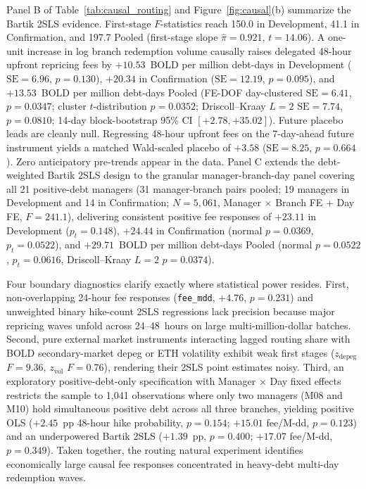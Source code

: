 Panel B of Table~\ref{tab:causal_routing} and Figure~\ref{fig:causal}(b) summarize the Bartik 2SLS evidence. First-stage $F$-statistics reach 150.0 in Development, 41.1 in Confirmation, and 197.7 Pooled (first-stage slope $\hat{\pi} = 0.921$, $t = 14.06$). A one-unit increase in log branch redemption volume causally raises delegated 48-hour upfront repricing fees by $+10.53$~BOLD per million debt-days in Development ($\text{SE} = 6.96$, $p = 0.130$), $+20.34$ in Confirmation ($\text{SE} = 12.19$, $p = 0.095$), and $+13.53$~BOLD per million debt-days Pooled (FE-DOF day-clustered $\text{SE} = 6.41$, $p = 0.0347$; cluster $t$-distribution $p = 0.0352$; Driscoll--Kraay $L = 2$ $\text{SE} = 7.74$, $p = 0.0810$; 14-day block-bootstrap 95\% CI $[+2.78, +35.02]$). Future placebo leads are cleanly null. Regressing 48-hour upfront fees on the 7-day-ahead future instrument yields a matched Wald-scaled placebo of $+3.58$ ($\text{SE} = 8.25$, $p = 0.664$). Zero anticipatory pre-trends appear in the data. Panel C extends the debt-weighted Bartik 2SLS design to the granular manager-branch-day panel covering all 21 positive-debt managers (31 manager-branch pairs pooled; 19 managers in Development and 14 in Confirmation; $N = 5{,}061$, Manager $\times$ Branch FE + Day FE, $F = 241.1$), delivering consistent positive fee responses of $+23.11$ in Development ($p_t = 0.148$), $+24.44$ in Confirmation (normal $p = 0.0369$, $p_t = 0.0522$), and $+29.71$~BOLD per million debt-days Pooled (normal $p = 0.0522$, $p_t = 0.0616$, Driscoll--Kraay $L = 2$ $p = 0.0374$).

Four boundary diagnostics clarify exactly where statistical power resides. First, non-overlapping 24-hour fee responses (\texttt{fee\_mdd}, $+4.76$, $p = 0.231$) and unweighted binary hike-count 2SLS regressions lack precision because major repricing waves unfold across 24--48~hours on large multi-million-dollar batches. Second, pure external market instruments interacting lagged routing share with BOLD secondary-market depeg or ETH volatility exhibit weak first stages ($z_{\text{depeg}}$ $F = 9.36$, $z_{\text{vol}}$ $F = 0.76$), rendering their 2SLS point estimates noisy. Third, an exploratory positive-debt-only specification with Manager $\times$ Day fixed effects restricts the sample to 1,041 observations where only two managers (M08 and M10) hold simultaneous positive debt across all three branches, yielding positive OLS ($+2.45$~pp 48-hour hike probability, $p = 0.154$; $+15.01$ fee/M-dd, $p = 0.123$) and an underpowered Bartik 2SLS ($+1.39$~pp, $p = 0.400$; $+17.07$ fee/M-dd, $p = 0.349$). Taken together, the routing natural experiment identifies economically large causal fee responses concentrated in heavy-debt multi-day redemption waves.

